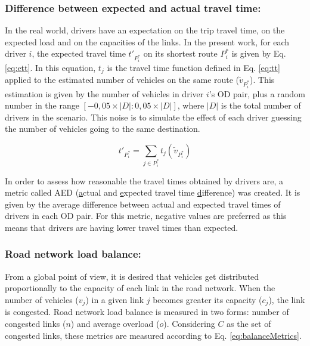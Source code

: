 \documentclass{RITA}
\newcommand{\optRoute}[1]{\ensuremath{P_#1^*}}	%
\newcommand{\travTime}{\ensuremath{t_j}} 	%
\newcommand{\linkCap}{\ensuremath{c_j}}		%
\newcommand{\veh}{\ensuremath{v}}		%
\newcommand{\ett}[1]{\ensuremath{t'_{#1}}}		%
\newcommand{\expVeh}[1]{\ensuremath{\tilde{\veh}_{\optRoute{#1}}}}		%
\begin{document}
\subsubsection{Difference between expected and actual travel time:}
\label{sec:ttMetric}
In the real world, drivers have an expectation on the trip travel time, on the expected load and on the capacities of the links. In the present work, for each driver $i$, the expected travel time $\ett{\optRoute{i}}$ on its shortest route $\optRoute{i}$ is given by Eq. \eqref{eq:ett}. In this equation, $\travTime$ is the travel time function defined in Eq. \eqref{eq:tt} applied to the estimated number of vehicles on the same route ($\expVeh{i}$). This estimation is given by the number of vehicles in driver $i$'s OD pair, plus a random number in the range $[-0,05 \times |D| : 0,05 \times |D|]$, where $|D|$ is the total number of drivers in the scenario. This noise is to simulate the effect of each driver guessing the number of vehicles going to the same destination.

\begin{equation}
\label{eq:ett}
\ett{\optRoute{i}} = \sum_{j \in \optRoute{i}}\travTime(\expVeh{i})
\end{equation}

In order to assess how reasonable the travel times obtained by drivers are, a metric called AED (\underline{a}ctual and \underline{e}xpected travel time \underline{d}ifference) was created. It is given by the average difference between actual and expected travel times of drivers in each OD pair. For this metric, negative values are preferred as this means that drivers are having lower travel times than expected. %

\subsubsection{Road network load balance:}
\label{sec:loadBalanceMetrics}
From a global point of view, it is desired that vehicles get distributed proportionally to the capacity of each link in the road network. When the number of vehicles ($\veh_j$) in a given link $j$ becomes greater its capacity ($\linkCap$), the link is congested. Road network load balance is measured in two forms: number of congested links ($n$) and average overload ($o$). Considering $C$ as the set of congested links, these metrics are measured according to Eq. \eqref{eq:balanceMetrics}. 
\end{document}
